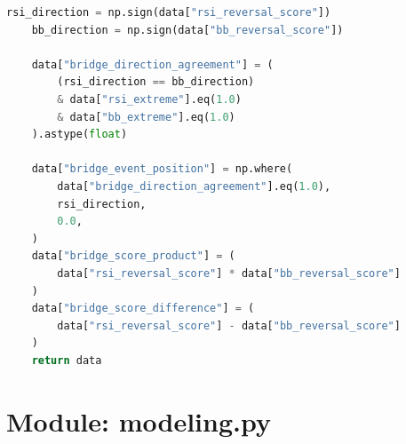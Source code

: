 \documentclass[11pt,a4paper]{report}
\begin{document}
\begin{lstlisting}[language=Python]
    rsi_direction = np.sign(data["rsi_reversal_score"])
    bb_direction = np.sign(data["bb_reversal_score"])

    data["bridge_direction_agreement"] = (
        (rsi_direction == bb_direction)
        & data["rsi_extreme"].eq(1.0)
        & data["bb_extreme"].eq(1.0)
    ).astype(float)

    data["bridge_event_position"] = np.where(
        data["bridge_direction_agreement"].eq(1.0),
        rsi_direction,
        0.0,
    )
    data["bridge_score_product"] = (
        data["rsi_reversal_score"] * data["bb_reversal_score"]
    )
    data["bridge_score_difference"] = (
        data["rsi_reversal_score"] - data["bb_reversal_score"]
    )
    return data

\end{lstlisting}
\section{Module: modeling.py}
\end{document}
